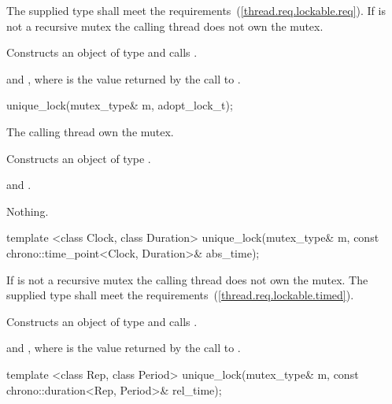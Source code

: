 \begin{itemdescr}
\pnum
\precondition
The supplied  type shall meet the 
requirements~(\ref{thread.req.lockable.req}).
If  is not a recursive mutex the calling thread does not own the mutex.

\pnum
\effects Constructs an object of type  and calls .

\pnum
\postconditions {} and , where  is
the value returned by the call to .
\end{itemdescr}

%
\begin{itemdecl}
unique_lock(mutex_type& m, adopt_lock_t);
\end{itemdecl}

\begin{itemdescr}
\pnum
\precondition The calling thread own the mutex.

\pnum
\effects Constructs an object of type .

\pnum
\postconditions {} and .

\pnum
\throws Nothing.
\end{itemdescr}

%
\begin{itemdecl}
template <class Clock, class Duration>
  unique_lock(mutex_type& m, const chrono::time_point<Clock, Duration>& abs_time);
\end{itemdecl}

\begin{itemdescr}
\pnum
\precondition If  is not a recursive mutex the calling thread
does not own the mutex. The supplied  type shall meet the
 requirements~(\ref{thread.req.lockable.timed}).

\pnum
\effects Constructs an object of type  and calls .

\pnum
\postconditions {} and , where  is
the value returned by the call to .
\end{itemdescr}

%
\begin{itemdecl}
template <class Rep, class Period>
  unique_lock(mutex_type& m, const chrono::duration<Rep, Period>& rel_time);
\end{itemdecl}

